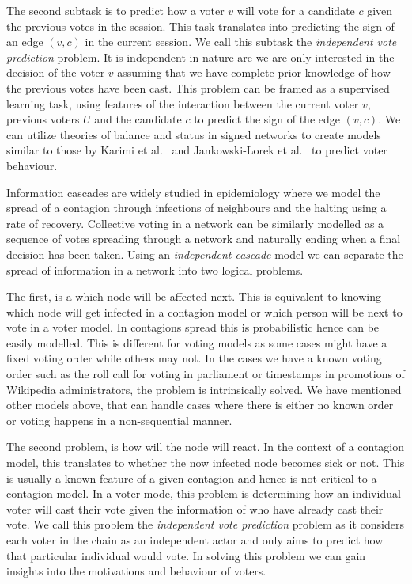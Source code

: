 The second subtask is to predict how a voter $v$ will vote for a candidate $c$ given the previous votes in the session. This task translates into predicting the sign of an edge $(v,c)$ in the current session. We call this subtask the \textit{independent vote prediction} problem. It is independent in nature are we are only interested in the decision of the voter $v$ assuming that we have complete prior knowledge of how the previous votes have been cast. This problem can be framed as a supervised learning task, using features of the interaction between the current voter $v$, previous voters $U$ and the candidate $c$ to predict the sign of the edge $(v,c)$. We can utilize theories of balance and status in signed networks to create models similar to those by Karimi et al.\ \cite{karimi2019multicongress} and Jankowski-Lorek et al.\ \cite{jankowski-lorek2013MBSN} to predict voter behaviour.

\iffalse
{}
Information cascades are widely studied in epidemiology where we model the spread of a contagion through infections of neighbours and the halting using a rate of recovery. Collective voting in a network can be similarly modelled as a sequence of votes spreading through a network and naturally ending when a final decision has been taken. Using an \textit{independent cascade} model we can separate the spread of information in a network into two logical problems.

The first, is a which node will be affected next. This is equivalent to knowing which node will get infected in a contagion model or which person will be next to vote in a voter model. In contagions spread this is probabilistic hence can be easily modelled. This is different for voting models as some cases might have a fixed voting order while others may not. In the cases we have a known voting order such as the roll call for voting in parliament or timestamps in promotions of Wikipedia administrators, the problem is intrinsically solved. We have mentioned other models above, that can handle cases where there is either no known order or voting happens in a non-sequential manner. 

The second problem, is how will the node will react. In the context of a contagion model, this translates to whether the now infected node becomes sick or not. This is usually a known feature of a given contagion and hence is not critical to a contagion model. In a voter mode, this problem is determining how an individual voter will cast their vote given the information of who have already cast their vote. We call this problem the \textit{independent vote prediction} problem as it considers each voter in the chain as an independent actor and only aims to predict how that particular individual would vote. In solving this problem we can gain insights into the motivations and behaviour of voters. 

